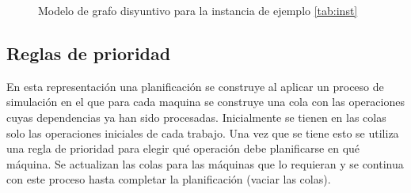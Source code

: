 \begin{figure}
\centering
{}
\caption{Modelo de grafo disyuntivo para la instancia de ejemplo \ref{tab:inst}}
\end{figure}

\subsection*{Reglas de prioridad}
En esta representación una planificación se construye al aplicar un proceso de simulación en el que para cada maquina se construye una cola con las operaciones cuyas dependencias ya han sido procesadas. Inicialmente se tienen en las colas solo las operaciones iniciales de cada trabajo. Una vez que se tiene esto se utiliza una regla de prioridad para elegir qué operación debe planificarse en qué máquina. Se actualizan las colas para las máquinas que lo requieran y se continua con este proceso hasta completar la planificación (vaciar las colas).

